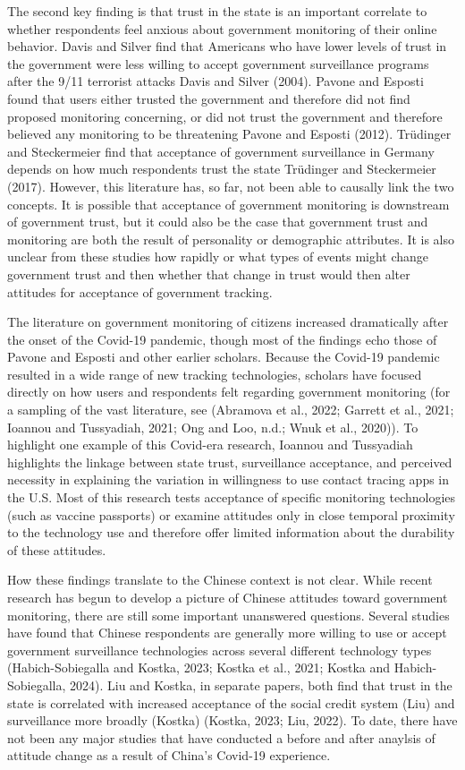\documentclass[
  letterpaper,
  DIV=11,
  numbers=noendperiod]{scrartcl}
\begin{document}
The second key finding is that trust in the state is an important
correlate to whether respondents feel anxious about government
monitoring of their online behavior. Davis and Silver find that
Americans who have lower levels of trust in the government were less
willing to accept government surveillance programs after the 9/11
terrorist attacks Davis and Silver (2004). Pavone and Esposti found that
users either trusted the government and therefore did not find proposed
monitoring concerning, or did not trust the government and therefore
believed any monitoring to be threatening Pavone and Esposti (2012).
Trüdinger and Steckermeier find that acceptance of government
surveillance in Germany depends on how much respondents trust the state
Trüdinger and Steckermeier (2017). However, this literature has, so far,
not been able to causally link the two concepts. It is possible that
acceptance of government monitoring is downstream of government trust,
but it could also be the case that government trust and monitoring are
both the result of personality or demographic attributes. It is also
unclear from these studies how rapidly or what types of events might
change government trust and then whether that change in trust would then
alter attitudes for acceptance of government tracking.

The literature on government monitoring of citizens increased
dramatically after the onset of the Covid-19 pandemic, though most of
the findings echo those of Pavone and Esposti and other earlier
scholars. Because the Covid-19 pandemic resulted in a wide range of new
tracking technologies, scholars have focused directly on how users and
respondents felt regarding government monitoring (for a sampling of the
vast literature, see (Abramova et al., 2022; Garrett et al., 2021;
Ioannou and Tussyadiah, 2021; Ong and Loo, n.d.; Wnuk et al., 2020)). To
highlight one example of this Covid-era research, Ioannou and Tussyadiah
highlights the linkage between state trust, surveillance acceptance, and
perceived necessity in explaining the variation in willingness to use
contact tracing apps in the U.S. Most of this research tests acceptance
of specific monitoring technologies (such as vaccine passports) or
examine attitudes only in close temporal proximity to the technology use
and therefore offer limited information about the durability of these
attitudes.

How these findings translate to the Chinese context is not clear. While
recent research has begun to develop a picture of Chinese attitudes
toward government monitoring, there are still some important unanswered
questions. Several studies have found that Chinese respondents are
generally more willing to use or accept government surveillance
technologies across several different technology types
(Habich-Sobiegalla and Kostka, 2023; Kostka et al., 2021; Kostka and
Habich-Sobiegalla, 2024). Liu and Kostka, in separate papers, both find
that trust in the state is correlated with increased acceptance of the
social credit system (Liu) and surveillance more broadly (Kostka)
(Kostka, 2023; Liu, 2022). To date, there have not been any major
studies that have conducted a before and after anaylsis of attitude
change as a result of China's Covid-19 experience.
\end{document}
